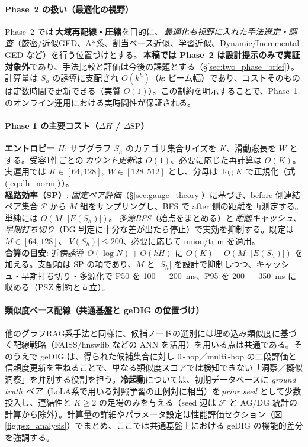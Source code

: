 \documentclass[ja=standard,xelatex]{bxjsarticle}
\newcommand{\F}{\mathcal{F}}
\begin{document}
\paragraph{Phase~2 の扱い（最適化の視野）}
Phase~2 では\,\textbf{大域再配線・圧縮}を目的に、\,\emph{最適化も視野に入れた手法選定・調査}（厳密/近似GED、A*系、割当ベース近似、学習近似、Dynamic/Incremental GED など）を行う位置づけとする。\,\textbf{本稿では Phase~2 は設計提示のみで実証対象外}であり、手法比較と評価は今後の課題とする（\S\ref{sec:two_phase_brief}）。
計算量は $S_h$ の誘導に支配され $O(k^h)$（$k$: ビーム幅）であり、コストそのものは定数時間で更新できる（実質 $O(1)$）。この制約を明示することで、Phase~1 のオンライン運用における実時間性が保証される。

\paragraph{Phase 1 の主要コスト（$\Delta H$ / $\Delta \mathrm{SP}$）}
\textbf{エントロピー $H$}: サブグラフ $S_h$ のカテゴリ集合サイズを $K$、滑動窓長を $W$ とする。受容1件ごとの\,\emph{カウント更新}は $O(1)$、必要に応じた再計算は $O(K)$。実運用では $K\in[64,128],\;W\in[128,512]$ とし、分母は $\log K$ で正規化（式\,(\ref{eq:dh_norm}））。
\\
\textbf{経路効率（SP）}: \emph{固定ペア評価}（\S\ref{sec:gauge_theory}）に基づき、before 側連結ペア集合 $\mathcal{P}$ から $M$ 組をサンプリングし、BFS で after 側の距離を再測定する。単純には $O(M\cdot |E(S_h)|)$。\,\emph{多源BFS}（始点をまとめる）と\,\emph{距離キャッシュ}、\,\emph{早期打ち切り}（DG 判定に十分な差が出たら停止）で実効を抑制する。既定は $M\in[64,128]$、$|V(S_h)|\le200$、必要に応じて union/trim を適用。
\\
\textbf{合算の目安}: 近傍誘導 $O(\log N)+O(kH)$ に $O(K)+O(M\cdot |E(S_h)|)$ を加える。支配項は SP の項であり、$M$ と $|S_h|$ を設計で抑制しつつ、キャッシュ・早期打ち切り・多源化で P50 を \SI{100}{--}\SI{200}{ms}、P95 を \SI{200}{--}\SI{350}{ms} に収める（PSZ 制約と両立）。

\paragraph{類似度ベース配線（共通基盤と geDIG の位置づけ）}
他のグラフRAG系手法\cite{graphrag2024,dygrag2024,kedkg2024}と同様に、候補ノードの選別には埋め込み類似度に基づく配線戦略（FAISS/hnswlib などの ANN を活用）を用いる点は共通である。そのうえで geDIG は、得られた候補集合に対し 0\,\mbox{-}hop／multi\,\mbox{-}hop の二段評価と信頼度更新を重ねることで、単なる類似度スコアでは検知できない「洞察／擬似洞察」を弁別する役割を担う。\textbf{冷起動}については、初期データベースに \emph{ground truth ペア}（LoLA系で用いる対照学習の正例対に相当）を\,\emph{prior seed} として少数投入し、連結性と $K\ge2$ の足場のみを与える（seed 辺は $\F$ と AG/DG 統計の計算から除外）。計算量の詳細やパラメータ設定は性能評価セクション（図\ref{fig:psz_analysis}）でまとめ、ここでは共通基盤上における geDIG の機能的差分を強調する。
\end{document}

